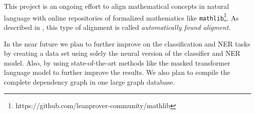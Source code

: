 \documentclass[submission,copyright,creativecommons]{eptcs}
\begin{document}
This project is an ongoing effort to align mathematical concepts
in natural language with  online repositories of formalized
mathematics like
\texttt{mathlib}\footnote{https://github.com/leanprover-community/mathlib}. 
As described in \cite{kaliszyk2016standard}, this type of alignment is called \emph{automatically found aligment}.

In the near future we plan to further improve on the classification 
and NER tasks by creating a data set using solely the neural version
of the classifier and NER model. Also,  by using state-of-the-art
methods like the masked transformer language model \cite{bert} to
further improve the results. 
We also plan to compile the complete dependency graph in one 
large graph database. 








\end{document}
